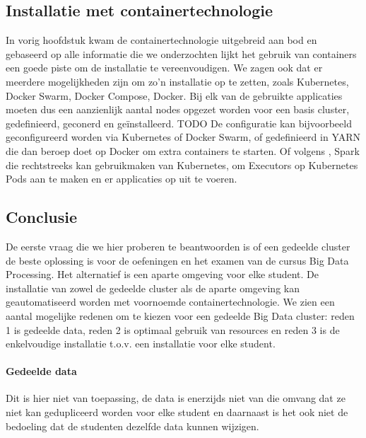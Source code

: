 \subsection{Installatie met containertechnologie}
In vorig hoofdstuk kwam de containertechnologie uitgebreid aan bod en gebaseerd op alle informatie die we onderzochten lijkt het gebruik van containers een goede piste om de installatie te vereenvoudigen.
\newline
We zagen ook dat er meerdere mogelijkheden zijn om zo'n installatie op te zetten, zoals Kubernetes, Docker Swarm, Docker Compose, Docker.
\newline
Bij elk van de gebruikte applicaties moeten dus een aanzienlijk aantal nodes opgezet worden voor een basis cluster, gedefinieerd, geconerd en geïnstalleerd. TODO
\newline
De configuratie kan bijvoorbeeld geconfigureerd worden via Kubernetes of Docker Swarm, of gedefinieerd in YARN die dan beroep doet op Docker om extra containers te starten. Of volgens \textcite{Spark2023d}, Spark die rechtstreeks kan gebruikmaken van Kubernetes, om Executors op Kubernetes Pods aan te maken en er applicaties op uit te voeren.
\newline
\newline

\subsection{Conclusie}
De eerste vraag die we hier proberen te beantwoorden is of een gedeelde cluster de beste oplossing is voor de oefeningen en het examen van de cursus Big Data Processing. Het alternatief is een aparte omgeving voor elke student.
\newline
De installatie van zowel de gedeelde cluster als de aparte omgeving kan geautomatiseerd worden met voornoemde containertechnologie.
\newline
We zien een aantal mogelijke redenen om te kiezen voor een gedeelde Big Data cluster: reden 1 is gedeelde data, reden 2 is optimaal gebruik van resources en reden 3 is de enkelvoudige installatie t.o.v. een installatie voor elke student.

\paragraph{Gedeelde data}
Dit is hier niet van toepassing, de data is enerzijds niet van die omvang dat ze niet kan gedupliceerd worden voor elke student en daarnaast is het ook niet de bedoeling dat de studenten dezelfde data kunnen wijzigen.

